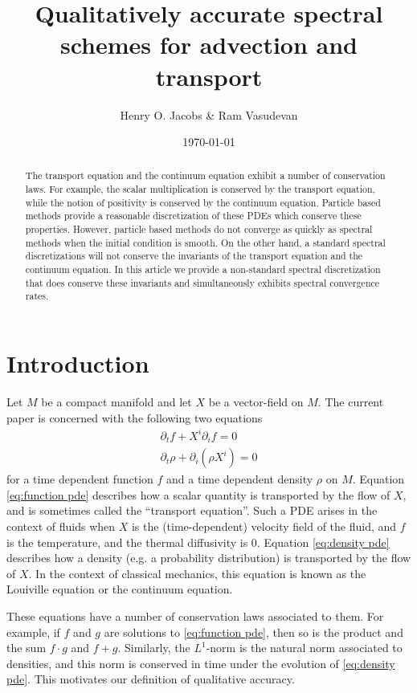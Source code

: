 \documentclass[final,leqno]{siamltex1213}
\title{Qualitatively accurate spectral schemes for advection and transport}
\author{Henry O. Jacobs \& Ram Vasudevan}
\date{\today}
\begin{document}
\maketitle

\begin{abstract}
	The transport equation and the continuum equation exhibit a number of conservation laws.
	For example, the scalar multiplication is conserved by the transport equation, while
	the notion of positivity is conserved by the continuum equation.
	Particle based methods provide a reasonable discretization of these PDEs which conserve these properties.
	However, particle based methods do not converge as quickly as spectral methods when the initial condition is smooth.
	On the other hand, a standard spectral discretizations will not conserve the invariants of the transport equation and the continuum equation.
	In this article we provide a non-standard spectral discretization that does conserve these invariants and simultaneously exhibits spectral convergence rates. 
\end{abstract}

\section{Introduction}
\label{sec:intro}

Let $M$ be a compact manifold and let $X$ be a vector-field on $M$. The current paper is concerned with the following two equations
\begin{align}
	\partial_{t} f + X^{i} \partial_{i} f = 0 \label{eq:function pde} \\
	\partial_{t} \rho + \partial_{i} (\rho X^{i}) = 0 \label{eq:density pde}
\end{align}
for a time dependent function $f$ and a time dependent density $\rho$ on $M$.
Equation \eqref{eq:function pde} describes how a scalar quantity is transported by the flow of $X$, and is sometimes called the ``transport equation''.
Such a PDE arises in the context of fluids when $X$ is the (time-dependent) velocity field of the fluid, and $f$ is the temperature, and the thermal diffusivity is $0$.
Equation \eqref{eq:density pde} describes how a density (e.g. a probability distribution) is transported by the flow of $X$.
In the context of classical mechanics, this equation is known as the Louiville equation or the continuum equation.

These equations have a number of conservation laws associated to them.
For example, if $f$ and $g$ are solutions to \eqref{eq:function pde},
then so is the product and the sum $f\cdot g$ and $f+g$.
Similarly, the $L^{1}$-norm is the natural norm associated to densities, and this norm is conserved in time under the evolution of \eqref{eq:density pde}.
This motivates our definition of qualitative accuracy.
\end{document}
